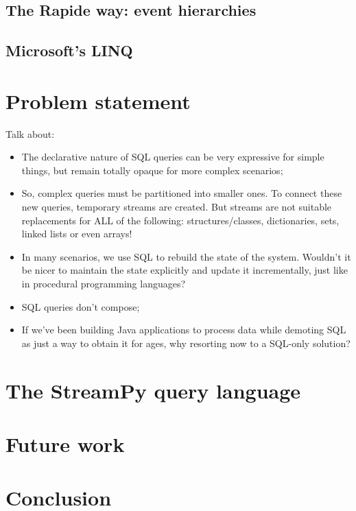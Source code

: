 \documentclass{report}
\begin{document}
\section{The Rapide way: event hierarchies}

\section{Microsoft's LINQ}

\chapter{Problem statement}\label{problem-statement}

Talk about:
\begin{itemize}
\item The declarative nature of SQL queries can be very expressive for simple things, but remain totally opaque for more complex scenarios;
\item So, complex queries must be partitioned into smaller ones. To connect these new queries, temporary streams are created. But streams are not suitable replacements for ALL of the following: structures/classes, dictionaries, sets, linked lists or even arrays!
\item In many scenarios, we use SQL to rebuild the state of the system. Wouldn't it be nicer to maintain the state explicitly and update it incrementally, just like in procedural programming languages?
\item SQL queries don't compose;
\item If we've been building Java applications to process data while demoting SQL as just a way to obtain it for ages, why resorting now to a SQL-only solution?
\end{itemize}

\chapter{The StreamPy query language}\label{streampy}

\chapter{Future work}\label{future-work}

\chapter{Conclusion}\label{conclusion}
\end{document}
